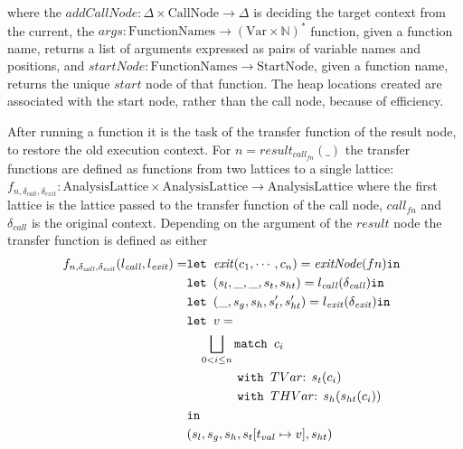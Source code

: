 where the $\mathit{addCallNode} : \Delta \times \text{CallNode} \rightarrow \Delta$ is deciding the target context from the current, the $\mathit{args} : \text{FunctionNames} \rightarrow (\text{Var} \times \mathbb{N})^*$ function, given a function name, returns a list of arguments expressed as pairs of variable names and positions, and $\mathit{startNode} : \text{FunctionNames} \rightarrow \text{StartNode}$, given a function name, returns the unique $\mathit{start}$ node of that function. The heap locations created are associated with the start node, rather than the call node, because of efficiency. 

After running a function it is the task of the transfer function of the result node, to restore the old execution context.  For $n = \mathit{result}_{\mathit{call}_{fn}}(\_)$ the transfer functions are defined as functions from two lattices to a single lattice: $f_{n,\delta_{\mathit{call}},\delta_{\mathit{exit}}}: \text{AnalysisLattice} \times \text{AnalysisLattice} \rightarrow \text{AnalysisLattice}$ where the first lattice is the lattice passed to the transfer function of the call node, ${\mathit{call}_{fn}}$ and $\delta_{\mathit{call}}$ is the original context. Depending on the argument of the $\mathit{result}$ node the transfer function is defined as either
\begin{align}
f_{n,\delta_{\mathit{call}}, \delta_{\mathit{exit}}}(l_{\mathit{call}}, l_{\mathit{exit}})=   &\texttt{let } \mathit{exit}(c_1, \cdots, c_n) = \mathit{exitNode}(fn) \texttt{in }\notag\\
                                                &\texttt{let } (s_l, \_, \_, s_t, s_{ht}) = l_{\mathit{call}}(\delta_{\mathit{call}}) \texttt{in }\notag\\
                                                &\texttt{let } (\_, s_g, s_h, s_t', s_{ht}') = l_{\mathit{exit}}(\delta_{\mathit{exit}}) \texttt{in }\notag\\
                                                &\texttt{let } v = \notag\\
                                                &\quad \bigsqcup_{0<i \leq n} \texttt{match }c_i\notag\\
                                                &\quad\quad\quad\quad \texttt{with }TVar\text{: } s_t(c_i)\notag\\
                                                &\quad\quad\quad\quad \texttt{with }THVar\text{: } s_h(s_{ht}(c_i))\notag\\
                                                & \texttt{in }\notag\\
                                                &(s_l,s_g,s_h, s_t[t_{val}\mapsto v], s_{ht})
\end{align}
